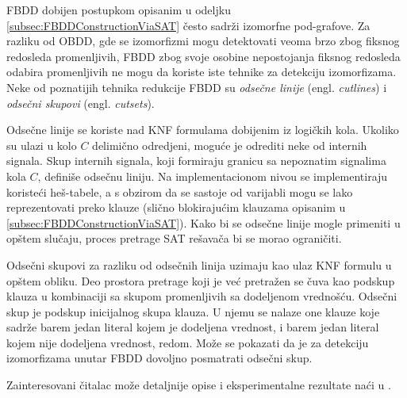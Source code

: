 FBDD dobijen postupkom opisanim u odeljku \ref{subsec:FBDDConstructionViaSAT} \v{c}esto sadr\v{z}i izomorfne pod-grafove. Za razliku od OBDD, gde se izomorfizmi mogu detektovati veoma brzo zbog fiksnog redosleda promenljivih, FBDD zbog svoje osobine nepostojanja fiksnog redosleda odabira promenljivih ne mogu da koriste iste tehnike za detekciju izomorfizama. Neke od poznatijih tehnika redukcije FBDD su \emph{odse\v{c}ne linije} (engl. \emph{cutlines}) i \emph{odse\v{c}ni skupovi} (engl. \emph{cutsets}).

Odse\v{c}ne linije se koriste nad KNF formulama dobijenim iz logi\v{c}kih kola. Ukoliko su ulazi u kolo $C$ delimi\v{c}no odredjeni, mogu\'c{}e je odrediti neke od internih signala. Skup internih signala, koji formiraju granicu sa nepoznatim signalima kola $C$, defini\v{s}e odse\v{c}nu liniju. Na implementacionom nivou se implementiraju koriste\'c{}i he\v{s}-tabele, a s obzirom da se sastoje od varijabli mogu se lako reprezentovati preko klauze (sli\v{c}no blokiraju\'c{}im klauzama opisanim u \ref{subsec:FBDDConstructionViaSAT}). Kako bi se odse\v{c}ne linije mogle primeniti u op\v{s}tem slu\v{c}aju, proces pretrage SAT re\v{s}ava\v{c}a bi se morao ograni\v{c}iti.

Odse\v{c}ni skupovi za razliku od odse\v{c}nih linija uzimaju kao ulaz KNF formulu u op\v{s}tem obliku. Deo prostora pretrage koji je ve\'c{} pretra\v{z}en se \v{c}uva kao podskup klauza u kombinaciji sa skupom promenljivih sa dodeljenom vredno\v{s}\'c{}u. Odse\v{c}ni skup je podskup inicijalnog skupa klauza. U njemu se nalaze one klauze koje sadr\v{z}e barem jedan literal kojem je dodeljena vrednost, i barem jedan literal kojem nije dodeljena vrednost, redom. Mo\v{z}e se pokazati da je za detekciju izomorfizama unutar FBDD dovoljno posmatrati odse\v{c}ni skup.

Zainteresovani \v{c}italac mo\v{z}e detaljnije opise i eksperimentalne rezultate na\'c{}i u \cite{FBDD}.
